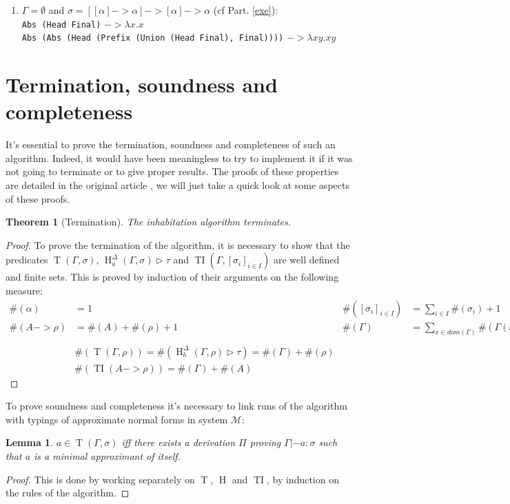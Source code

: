 \documentclass{article}
\DeclareMathOperator{\iT}{T}
\DeclareMathOperator{\iH}{H}
\DeclareMathOperator{\iTI}{TI}
\newtheorem*{Th*}{Theorem}
\newtheorem*{Lem*}{Lemma}
\def\sysm{system $\mathcal{M}$}
\begin{document}
\begin{enumerate}
    \item $\Gamma = \emptyset$ and $\sigma = [[\alpha] -> \alpha] -> [\alpha] -> \alpha$ (cf Part. \ref{exe}): \\
        \qquad \texttt{Abs (Head Final)} $->\lambda x.x$\\
        \qquad \texttt{Abs (Abs (Head (Prefix (Union (Head Final), Final))))} $->\lambda xy.xy$    
\end{enumerate}

\section{Termination, soundness and completeness}
It's essential to prove the termination, soundness and completeness of such an algorithm. Indeed, it would have been meaningless to try to implement it if it was not going to terminate or to give proper results. The proofs of these properties are detailed in the original article \cite{Kes}, we will just take a quick look at some aspects of these proofs.

\begin{Th*}[Termination]
    The inhabitation algorithm terminates.
\end{Th*}

\begin{proof}
    To prove the termination of the algorithm, it is necessary to show that the predicates $\iT(\Gamma, \sigma)$, $\iH^\Delta_a(\Gamma, \sigma) \triangleright \tau$ and $\iTI(\Gamma, [\sigma_i]_{i \in I})$ are well defined and finite sets. This is proved by induction of their arguments on the following measure:
    \begin{align*}
    \#(\alpha) &= 1 & \#([\sigma_i]_{i\in I}) &= \textstyle \sum_{i\in I}\#(\sigma_i) +1
    \\ \#(A -> \rho) &= \#(A) + \#(\rho) + 1 & \#(\Gamma) &= \textstyle \sum_{x\in dom(\Gamma)} \#(\Gamma(x))
    \\\\&\#(\iT(\Gamma, \rho)) = \#(\iH_b^\Delta(\Gamma, \rho) \triangleright \tau) = \#(\Gamma) + \#(\rho)
    \\&\#(\iTI(A -> \rho)) =  \#(\Gamma) + \#(A)
    \end{align*}
\end{proof}

 To prove soundness and completeness it's necessary to link runs of the algorithm with typings of approximate normal forms in \sysm:
 \begin{Lem*}
  $a \in \iT(\Gamma, \sigma)$ iff there exists a derivation $\Pi$ proving $\Gamma |- a : \sigma$ such that $a$ is a minimal approximant of itself.
\end{Lem*}
\begin{proof}
This is done by working separately on $\iT$, $\iH$ and $\iTI$, by induction on the rules of the algorithm.
\end{proof}
\end{document}
